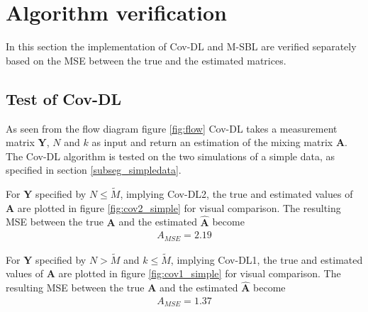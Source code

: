\section{Algorithm verification}
In this section the implementation of Cov-DL and M-SBL are verified separately based on the MSE between the true and the estimated matrices.

\subsection{Test of Cov-DL}
As seen from the flow diagram figure \ref{fig:flow} Cov-DL takes a measurement matrix $\textbf{Y}$, $N$ and $k$ as input and return an estimation of the mixing matrix $\textbf{A}$. The Cov-DL algorithm is tested on the two simulations of a simple data, as specified in section \ref{subseg_simpledata}. 

For $\textbf{Y}$ specified by $N\leq \widetilde{M}$, implying Cov-DL2, the true and estimated values of $\textbf{A}$ are plotted in figure \ref{fig:cov2_simple} for visual comparison.
The resulting MSE between the true $\textbf{A}$ and the estimated $\hat{\textbf{A}}$ become 
\begin{align*}
A_{MSE} = 2.19 
\end{align*}

For $\textbf{Y}$ specified by $N > \widetilde{M}$ and $k\leq \widetilde{M}$, implying Cov-DL1, the true and estimated values of $\textbf{A}$ are plotted in figure \ref{fig:cov1_simple} for visual comparison.
The resulting MSE between the true $\textbf{A}$ and the estimated $\hat{\textbf{A}}$ become 
\begin{align*}
A_{MSE} = 1.37
\end{align*}

